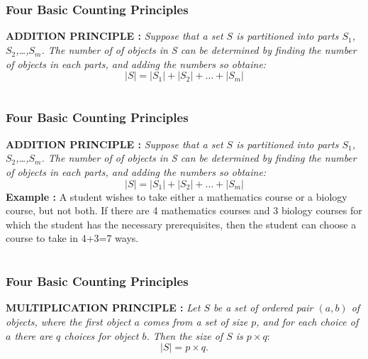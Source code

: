 \documentclass{beamer}
\begin{document}
\section{}
\begin{frame}
\frametitle{Four Basic Counting Principles}
{ \Large {\bf ADDITION PRINCIPLE :}}
    { \it{ Suppose that a set $S$ is partitioned into parts $S_1$,$S_2$,\dots ,$S_m$. The number of of objects in S can be determined by finding the number of objects in each parts, and adding the numbers so obtaine:}}
    $$|S| = |S_1|+|S_2|+\dots +|S_m|$$ 
    
    
    
    
    
    
    
\end{frame}



\section{}
\begin{frame}
\frametitle{Four Basic Counting Principles}

{ \Large {\bf ADDITION PRINCIPLE :}}
    { \it{ Suppose that a set $S$ is partitioned into parts $S_1$,$S_2$,\dots ,$S_m$. The number of of objects in S can be determined by finding the number of objects in each parts, and adding the numbers so obtaine:}}
    $$|S| = |S_1|+|S_2|+\dots +|S_m|$$ 
    { {\bf Example : }A student wishes to take either a mathematics course or a biology course, but not both. If there are 4 mathematics courses and 3 biology courses for which the student has the necessary prerequisites, then the student can choose a course to take in 4+3=7 ways.}\\ 

 
 \end{frame} 
 
 \section{}
 \begin{frame}
\frametitle{Four Basic Counting Principles}
 {\Large \bf MULTIPLICATION PRINCIPLE :} 
  {\it Let $S$ be a set of ordered pair $ (a,b) $ of objects, where the first object $a$ comes from a set of size $p$, and for each choice of $a$ there are $q$ choices for object $b$. Then the size of $S$ is  $ p\times q:$}\\$$|S|= p \times q.$$ 
  \end{frame}
 
\end{document}
